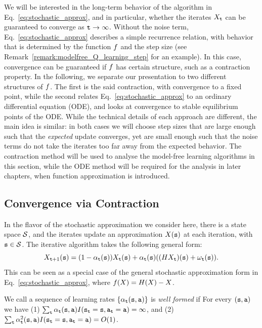 We will be interested in the long-term behavior of the algorithm in Eq.~\ref{eq:stochastic_approx}, and in particular, whether the iterates $X_{\tt t}$ can be guaranteed to converge as ${\tt t} \to \infty$.
Without the noise term, Eq.~\ref{eq:stochastic_approx} describes a simple recurrence relation, with behavior that is determined by the function $f$ and the step size (see Remark~\ref{remark:modelfree_Q_learning_step} for an example). In this case, convergence can be guaranteed if $f$ has certain structure, such as a contraction property. In the following, we separate our presentation to two different structures of $f$. The first is the said contraction, with convergence to a fixed point, while the second relates Eq.~\ref{eq:stochastic_approx} to an ordinary differential equation (ODE), and looks at convergence to stable equilibrium points of the ODE. While the technical details of each approach are different, the main idea is similar: in both cases we will choose step sizes that are large enough such that the \textit{expected} update converges, yet are small enough such that the noise terms do not take the iterates too far away from the expected behavior. The contraction method will be used to analyse the model-free learning algorithms in this section, while the ODE method will be required for the analysis in later chapters, when function approximation is introduced.

\subsection{Convergence via Contraction}
In the flavor of the stochastic approximation we consider here, there is a state space $\mathcal{S}$, and
the iterates update an approximation $X({\tt s})$ at each iteration, with ${\tt s} \in \mathcal{S}$. 
The iterative algorithm takes the following general form:
\[
X_{{\tt t}+1}({\tt s}) =
(1-\alpha_{\tt t}({\tt s}))X_{\tt t}({\tt s})+\alpha_{\tt t}({\tt s})((HX_{\tt t})({\tt s})+\omega_{\tt t}({\tt s})).
\]
This can be seen as a special case of the general stochastic approximation form in Eq.~\ref{eq:stochastic_approx}, where $f(X) = H(X) - X$.

We call a sequence of learning rates $\{\alpha_{\tt t}({\tt s},{\tt a})\}$ is \emph{well formed} if For every $({\tt s},{\tt a})$ we have (1) $\sum_{\tt t}
\alpha_{\tt t}({\tt s},{\tt a})
I({\tt s}_{\tt t}={\tt s},{\tt a}_{\tt t}={\tt a})=\infty $, and (2)
$\sum_{\tt t} \alpha_{\tt t}^2({\tt s},{\tt a})
I({\tt s}_{\tt t}={\tt s},{\tt a}_{\tt t}={\tt a})=O(1)$.

